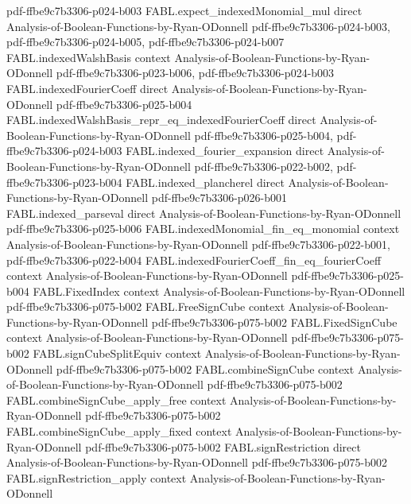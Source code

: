 \begin{theorem}
{    pdf-ffbe9c7b3306-p024-b003}
\proofstep
  {FABL.expect_indexedMonomial_mul}
  {direct}
  {Analysis-of-Boolean-Functions-by-Ryan-ODonnell}
  {pdf-ffbe9c7b3306-p024-b003,
    pdf-ffbe9c7b3306-p024-b005,
    pdf-ffbe9c7b3306-p024-b007}
\proofstep
  {FABL.indexedWalshBasis}
  {context}
  {Analysis-of-Boolean-Functions-by-Ryan-ODonnell}
  {pdf-ffbe9c7b3306-p023-b006,
    pdf-ffbe9c7b3306-p024-b003}
\proofstep
  {FABL.indexedFourierCoeff}
  {direct}
  {Analysis-of-Boolean-Functions-by-Ryan-ODonnell}
  {pdf-ffbe9c7b3306-p025-b004}
\proofstep
  {FABL.indexedWalshBasis_repr_eq_indexedFourierCoeff}
  {direct}
  {Analysis-of-Boolean-Functions-by-Ryan-ODonnell}
  {pdf-ffbe9c7b3306-p025-b004,
    pdf-ffbe9c7b3306-p024-b003}
\proofstep
  {FABL.indexed_fourier_expansion}
  {direct}
  {Analysis-of-Boolean-Functions-by-Ryan-ODonnell}
  {pdf-ffbe9c7b3306-p022-b002,
    pdf-ffbe9c7b3306-p023-b004}
\proofstep
  {FABL.indexed_plancherel}
  {direct}
  {Analysis-of-Boolean-Functions-by-Ryan-ODonnell}
  {pdf-ffbe9c7b3306-p026-b001}
\proofstep
  {FABL.indexed_parseval}
  {direct}
  {Analysis-of-Boolean-Functions-by-Ryan-ODonnell}
  {pdf-ffbe9c7b3306-p025-b006}
\proofstep
  {FABL.indexedMonomial_fin_eq_monomial}
  {context}
  {Analysis-of-Boolean-Functions-by-Ryan-ODonnell}
  {pdf-ffbe9c7b3306-p022-b001,
    pdf-ffbe9c7b3306-p022-b004}
\proofstep
  {FABL.indexedFourierCoeff_fin_eq_fourierCoeff}
  {context}
  {Analysis-of-Boolean-Functions-by-Ryan-ODonnell}
  {pdf-ffbe9c7b3306-p025-b004}
\proofstep
  {FABL.FixedIndex}
  {context}
  {Analysis-of-Boolean-Functions-by-Ryan-ODonnell}
  {pdf-ffbe9c7b3306-p075-b002}
\proofstep
  {FABL.FreeSignCube}
  {context}
  {Analysis-of-Boolean-Functions-by-Ryan-ODonnell}
  {pdf-ffbe9c7b3306-p075-b002}
\proofstep
  {FABL.FixedSignCube}
  {context}
  {Analysis-of-Boolean-Functions-by-Ryan-ODonnell}
  {pdf-ffbe9c7b3306-p075-b002}
\proofstep
  {FABL.signCubeSplitEquiv}
  {context}
  {Analysis-of-Boolean-Functions-by-Ryan-ODonnell}
  {pdf-ffbe9c7b3306-p075-b002}
\proofstep
  {FABL.combineSignCube}
  {context}
  {Analysis-of-Boolean-Functions-by-Ryan-ODonnell}
  {pdf-ffbe9c7b3306-p075-b002}
\proofstep
  {FABL.combineSignCube_apply_free}
  {context}
  {Analysis-of-Boolean-Functions-by-Ryan-ODonnell}
  {pdf-ffbe9c7b3306-p075-b002}
\proofstep
  {FABL.combineSignCube_apply_fixed}
  {context}
  {Analysis-of-Boolean-Functions-by-Ryan-ODonnell}
  {pdf-ffbe9c7b3306-p075-b002}
\proofstep
  {FABL.signRestriction}
  {direct}
  {Analysis-of-Boolean-Functions-by-Ryan-ODonnell}
  {pdf-ffbe9c7b3306-p075-b002}
\proofstep
  {FABL.signRestriction_apply}
  {context}
  {Analysis-of-Boolean-Functions-by-Ryan-ODonnell}

\end{theorem}
